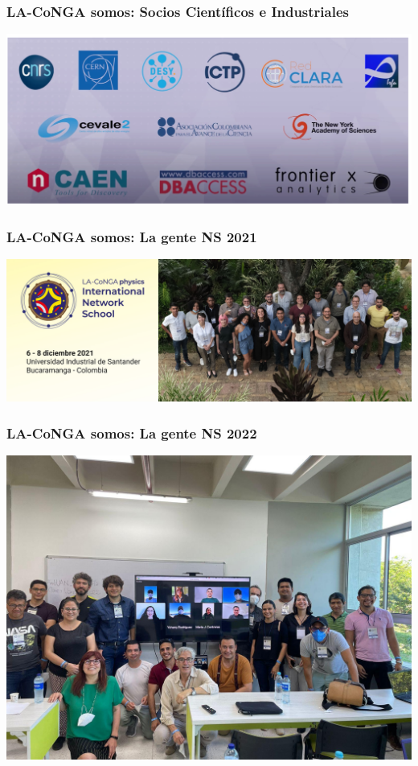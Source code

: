 
\begin{frame}[fragile]
\frametitle{LA-CoNGA somos: Socios Científicos e Industriales}

\begin{center}
\includegraphics[scale=0.5]{imagenes/sociosCienInd.png}
\end{center}

\end{frame}

\begin{frame}[fragile]
\frametitle{LA-CoNGA somos: La gente NS 2021}

\begin{center}
\includegraphics[scale=0.15]{imagenes/banner-2021-bucaramanga.jpg}
\end{center}

\end{frame}

\begin{frame}[fragile]
\frametitle{LA-CoNGA somos: La gente NS 2022}

\begin{center}
\includegraphics[scale=0.15]{imagenes/grupoNS2022.jpg}
\end{center}

\end{frame}

